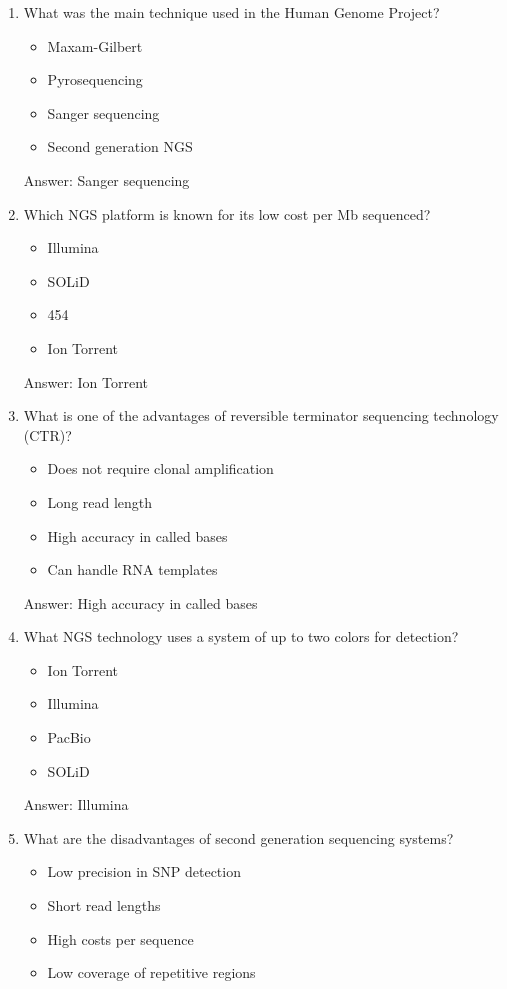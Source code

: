 \begin{enumerate}
\item What was the main technique used in the Human Genome Project?
\begin{itemize}
\item Maxam-Gilbert
\item Pyrosequencing
\item Sanger sequencing
\item Second generation NGS
\end{itemize}

Answer: Sanger sequencing

\item Which NGS platform is known for its low cost per Mb sequenced?
\begin{itemize}
\item Illumina
\item SOLiD
\item 454
\item Ion Torrent
\end{itemize}

Answer: Ion Torrent

\item What is one of the advantages of reversible terminator sequencing technology (CTR)?
\begin{itemize}
\item Does not require clonal amplification
\item Long read length
\item High accuracy in called bases
\item Can handle RNA templates
\end{itemize}

Answer: High accuracy in called bases

\item What NGS technology uses a system of up to two colors for detection?
\begin{itemize}
\item Ion Torrent
\item Illumina
\item PacBio
\item SOLiD
\end{itemize}

Answer: Illumina

\item What are the disadvantages of second generation sequencing systems?
\begin{itemize}
\item Low precision in SNP detection
\item Short read lengths
\item High costs per sequence
\item Low coverage of repetitive regions
\end{itemize}


\end{enumerate}
